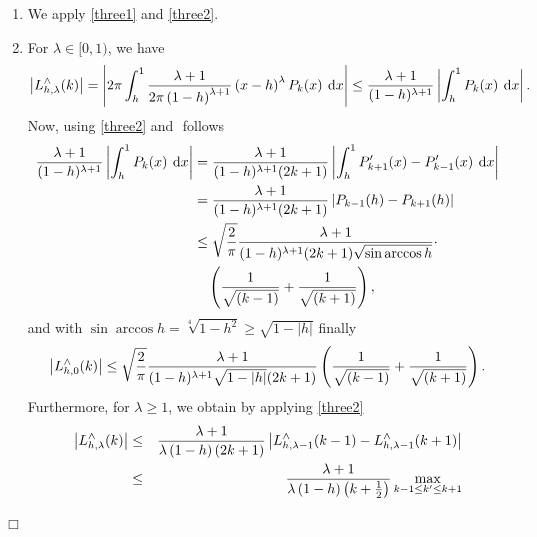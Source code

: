 \documentclass[11pt,a4paper,twoside,bibtotoc]{scrartcl}
\theoremstyle{plain}
\theoremstyle{definition}
\theoremstyle{remark}
\newenvironment{proof}{{\bf Proof.}}{$\Box$}
\newcommand{\abs}[1]{\ensuremath{\left\vert#1\right\vert}}
\newcommand{\fun}[2]{\ensuremath{#1{\hspace{-0.4ex}}\left(#2\right)}}
\newcommand{\paren}[1]{\ensuremath{\left(#1\right)}}
\newcommand{\dx}{\text{\rm{d}}}
\numberwithin{equation}{section}
\numberwithin{table}{section}
\numberwithin{figure}{section}
\begin{document}
\begin{proof}
  \begin{enumerate}
  \item We apply \eqref{three1} and \eqref{three2}.
  \item For $\lambda \in [0,1)$, we have
    \begin{equation*}
      \left|\fun{L_{h,\lambda}^{\wedge}}{k}\right| 
      = \abs{2\pi \int_{h}^1 \frac{\lambda+1}{2\pi\paren{1-h}^{\lambda+1}} 
        \paren{x-h}^{\lambda} \fun{P_{k}}{x} \: \dx x} 
      \le \frac{\lambda+1}{(1-h)^{\lambda+1}}\abs{\int_{h}^1 \fun{P_{k}}{x} \: \dx x}.
    \end{equation*}
    Now, using \eqref{three2} and ${}$ follows
    \begin{align*}
      \frac{\lambda+1}{(1-h)^{\lambda+1}}\abs{\int_{h}^1 \fun{P_{k}}{x} \: \dx x}
      & = \frac{\lambda+1}{(1-h)^{\lambda+1}(2k+1)}
          \abs{\int_{h}^1 \fun{P_{k+1}'}{x} - \fun{P_{k-1}'}{x} \: \dx x}\\
      & = \frac{\lambda+1}{(1-h)^{\lambda+1}(2k+1)}
          \abs{\fun{P_{k-1}}{h} - \fun{P_{k+1}}{h}}\\
      & \le \sqrt{\frac{2}{\pi}}\frac{\lambda+1}{(1-h)^{\lambda+1}(2k+1)
            \sqrt{\sin\arccos h}} \cdot \\
      & \quad \paren{\frac{1}{\sqrt{(k-1)}} + \frac{1}{\sqrt{(k+1)}}},
    \end{align*}
    and with $\sin\arccos h = \sqrt[4]{1-h^2} \ge \sqrt{1-|h|}$ finally
    \begin{equation}
      \label{SmallLambda}
      \left|\fun{L_{h,0}^{\wedge}}{k}\right| \le 
      \sqrt{\frac{2}{\pi}}\frac{\lambda+1}{(1-h)^{\lambda+1}\sqrt{1-|h|}(2k+1)}
      \paren{\frac{1}{\sqrt{(k-1)}} + \frac{1}{\sqrt{(k+1)}}}.
    \end{equation}
    Furthermore, for $\lambda \ge 1$, we obtain by applying \eqref{three2}
    \begin{eqnarray*}
      \left|\fun{L_{h,\lambda}^{\wedge}}{k}\right| &\le&
      \frac{\lambda+1}{\lambda\left(1-h\right)\left(2k+1\right)}
      \left|\fun{L_{h,\lambda-1}^{\wedge}}{k-1}-
        \fun{L_{h,\lambda-1}^{\wedge}}{k+1}\right|\\ &\le&
      \frac{\lambda+1}{\lambda\left(1-h\right)\left(k+\frac{1}{2}\right)}
      \max\limits_{k-1\le k'\le k+1}

\end{eqnarray*}
\end{enumerate}
\end{proof}
\end{document}
